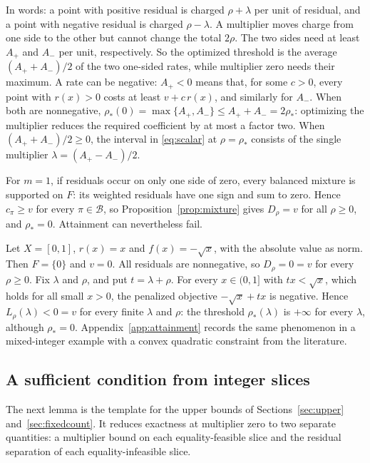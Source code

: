 In words: a point with positive residual is charged $\rho+\lambda$ per
unit of residual, and a point with negative residual is charged
$\rho-\lambda$. A multiplier moves charge from one side to the other but
cannot change the total $2\rho$. The two sides need at least $A_+$ and
$A_-$ per unit, respectively. So the optimized threshold is the average
$(A_++A_-)/2$ of the two one-sided rates, while multiplier zero needs
their maximum. A rate can be negative: $A_+<0$ means that, for some $c>0$, every point
with $r(x)>0$ costs at least $v+c\,r(x)$, and similarly for $A_-$. When both are nonnegative,
$\rho_*(0)=\max\{A_+,A_-\}\le A_++A_-=2\rho_*$: optimizing the
multiplier reduces the required coefficient by at most a factor two.
When $(A_++A_-)/2\ge0$, the interval in \eqref{eq:scalar} at
$\rho=\rho_*$ consists of the single multiplier $\lambda=(A_+-A_-)/2$.

For $m=1$, if residuals occur on only one side of zero, every balanced
mixture is supported on $F$: its weighted residuals have one sign and sum
to zero. Hence $c_\pi\ge v$ for every $\pi\in\mathcal B$, so
Proposition~\ref{prop:mixture} gives $D_\rho=v$ for all $\rho\ge0$, and
$\rho_*=0$. Attainment can nevertheless fail.

\begin{example}\label{ex:onesided}
Let $X=[0,1]$, $r(x)=x$ and $f(x)=-\sqrt x$, with the absolute value as
norm. Then $F=\{0\}$ and $v=0$. All residuals are nonnegative, so
$D_\rho=0=v$ for every $\rho\ge0$. Fix $\lambda$ and $\rho$, and put
$t=\lambda+\rho$. For every $x\in(0,1]$ with $tx<\sqrt x$, which holds
for all small $x>0$, the penalized objective $-\sqrt x+tx$ is negative.
Hence $L_\rho(\lambda)<0=v$ for every finite $\lambda$ and $\rho$: the
threshold $\rho_*(\lambda)$ is $+\infty$ for every $\lambda$, although
$\rho_*=0$. Appendix~\ref{app:attainment} records the same phenomenon in
a mixed-integer example with a convex quadratic constraint from the
literature.
\end{example}

\subsection{A sufficient condition from integer slices}
The next lemma is the template for the upper bounds of
Sections~\ref{sec:upper} and~\ref{sec:fixedcount}. It reduces exactness
at multiplier zero to two separate quantities: a multiplier bound on
each equality-feasible slice and the residual separation of each
equality-infeasible slice.

